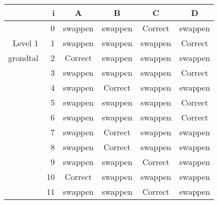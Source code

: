\begin{tabular}{ rr| c|c|c|c}\hline\hline
     & i & \textbf{A} & \textbf{B} & \textbf{C} & \textbf{D}\\\hline

&0&swappen&swappen&Correct\cellcolor[gray]{0.6}&swappen\\
Level 1 & 1&swappen&swappen&swappen&Correct\cellcolor[gray]{0.6}\\
grondtal &2&Correct\cellcolor[gray]{0.6}&swappen&swappen&swappen\\
&3&swappen&swappen&swappen&Correct\cellcolor[gray]{0.6}\\
&4&swappen&Correct\cellcolor[gray]{0.6}&swappen&swappen\\
&5&swappen&swappen&swappen&Correct\cellcolor[gray]{0.6}\\
&6&swappen&swappen&swappen&Correct\cellcolor[gray]{0.6}\\
&7&swappen&Correct\cellcolor[gray]{0.6}&swappen&swappen\\
&8&swappen&Correct\cellcolor[gray]{0.6}&swappen&swappen\\
&9&swappen&swappen&Correct\cellcolor[gray]{0.6}&swappen\\
&10&Correct\cellcolor[gray]{0.6}&swappen&swappen&swappen\\
&11&swappen&swappen&Correct\cellcolor[gray]{0.6}&swappen\\
\hline\end{tabular}\par\ \newline

